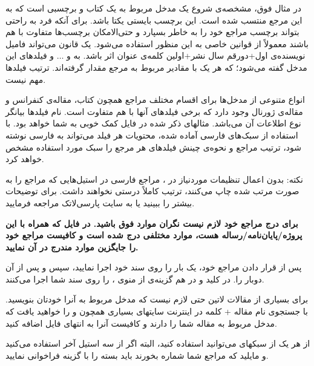 در مثال فوق،  مشخصه‌ی شروع یک مدخل مربوط به یک کتاب و  برچسبی است که به این مرجع منتسب شده است.
 این برچسب بایستی یکتا باشد. برای آنکه فرد به راحتی بتواند برچسب مراجع خود را به خاطر بسپارد و حتی‌الامکان برچسب‌ها متفاوت با هم باشند معمولاً از قوانین خاصی به این منظور استفاده می‌شود. یک قانون می‌تواند فامیل نویسنده‌ی اول+دورقم سال نشر+اولین کلمه‌ی عنوان اثر باشد. به  و $\dots$ و  فیلدهای این مدخل گفته می‌شود؛ که هر یک با مقادیر مربوط به مرجع مقدار گرفته‌اند. ترتیب فیلدها مهم نیست. 

انواع متنوعی از مدخل‌ها برای اقسام مختلف مراجع همچون کتاب، مقاله‌ی کنفرانس و مقاله‌ی ژورنال وجود دارد که برخی فیلدهای آنها با هم متفاوت است. 
نام فیلدها بیانگر نوع اطلاعات آن می‌باشد. مثالهای ذکر شده در فایل  کمک خوبی به شما خواهد بود. 
با استفاده از سبک‌های فارسی آماده شده، محتویات هر فیلد می‌تواند به فارسی نوشته شود، ترتیب مراجع و نحوه‌ی چینش فیلدهای هر مرجع را سبک مورد استفاده  مشخص خواهد کرد.

نکته: بدون اعمال تنظیمات موردنیاز  در ، مراجع فارسی در استیل‌هایی که مراجع را به صورت مرتب شده چاپ می‌کنند، ترتیب کاملاً درستی نخواهند داشت. برای توضیحات بیشتر \cite{persianbib87userguide} را ببینید یا به سایت پارسی‌لاتک مراجعه فرمایید.

\textbf{برای درج مراجع خود لازم نیست نگران موارد فوق باشید. در فایل 
 که همراه با این پروژه/پایان‌نامه/رساله هست، موارد مختلفی درج شده است و کافیست مراجع خود را جایگزین موارد مندرج در آن نمایید.
}

پس از قرار دادن مراجع خود، یک بار  را روی سند خود اجرا نمایید، سپس  و پس از آن دوبار  را. در  کلید  و در  هم گزینه‌ی  از منوی ،  را روی سند شما اجرا می‌کنند.

برای بسیاری از مقالات لاتین حتی لازم نیست که مدخل مربوط به آنرا خودتان بنویسید. با جستجوی نام مقاله + کلمه   در اینترنت سایتهای بسیاری همچون  و  را خواهید یافت که مدخل  مربوط به مقاله شما را دارند و کافیست آنرا به انتهای فایل  اضافه کنید.

از هر یک از سبکهای  می‌توانید استفاده کنید، البته اگر از سه استیل آخر استفاده می‌کنید و مایلید که مراجع شما شماره بخورند باید بسته  را با گزینه  فراخوانی نمایید.
\newpage
